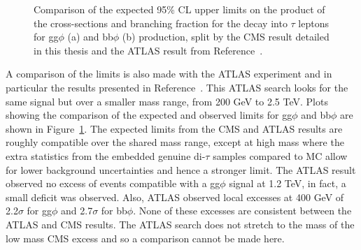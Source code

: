 \begin{figure}[!hbtp]
\centering
\caption[Plots of the comparison of the model-independent limits between CMS and ATLAS.]{Comparison of the expected 95\% CL upper limits on the product of the cross-sections and branching fraction for the decay into $\tau$ leptons for gg$\phi$ (a) and bb$\phi$ (b) production, split by the CMS result detailed in this thesis and the ATLAS result from Reference~\cite{ATLAS:2020zms}.}
\label{fig:model_independent_limits_ATLAS}
\end{figure}

A comparison of the limits is also made with the ATLAS experiment and in particular the results presented in Reference~\cite{ATLAS:2020zms}.
This ATLAS search looks for the same signal but over a smaller mass range, from 200 GeV to 2.5 TeV.
Plots showing the comparison of the expected and observed limits for gg$\phi$ and bb$\phi$ are shown in Figure~\ref{fig:model_independent_limits_ATLAS}.
The expected limits from the \ac{CMS} and ATLAS results are roughly compatible over the shared mass range, except at high mass where the extra statistics from the embedded genuine di-$\tau$ samples compared to \ac{MC} allow for lower background uncertainties and hence a stronger limit.
The ATLAS result observed no excess of events compatible with a gg$\phi$ signal at 1.2 TeV, in fact, a small deficit was observed.
Also, ATLAS observed local excesses at 400 GeV of 2.2$\sigma$ for gg$\phi$ and 2.7$\sigma$ for bb$\phi$.
None of these excesses are consistent between the ATLAS and \ac{CMS} results.
The ATLAS search does not stretch to the mass of the low mass \ac{CMS} excess and so a comparison cannot be made here.

